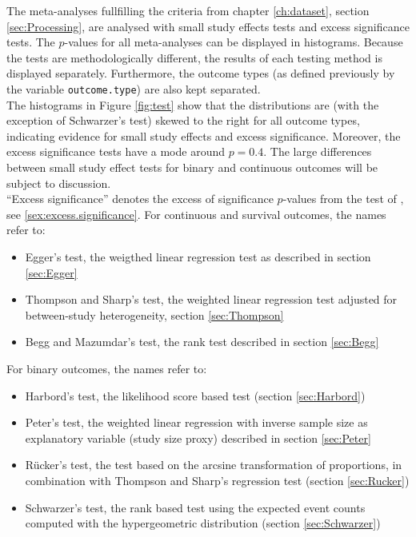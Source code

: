 \documentclass[11pt,a4paper,twoside]{book}\usepackage[]{graphicx}\usepackage[]{color}
\begin{document}
The meta-analyses fullfilling the criteria from chapter \ref{ch:dataset}, section \ref{sec:Processing}, are analysed with small study effects tests and excess significance tests. The $p$-values for all meta-analyses can be displayed in histograms. Because the tests are methodologically different, the results of each testing method is displayed separately. Furthermore, the outcome types (as defined previously by the variable \texttt{outcome.type}) are also kept separated.\\
The histograms in Figure \ref{fig:test} show that the distributions are (with the exception of Schwarzer's test) skewed to the right for all outcome types, indicating evidence for small study effects and excess significance. Moreover, the excess significance tests have a mode around $p = 0.4$. The large differences between small study effect tests for binary and continuous outcomes will be subject to discussion.\\
``Excess significance'' denotes the excess of significance $p$-values from the test of \citet{excess.significance}, see \ref{sex:excess.significance}. For continuous and survival outcomes, the names refer to: 

\begin{itemize}
\item Egger's test, the weigthed linear regression test as described in section \ref{sec:Egger}
\item Thompson and Sharp's test, the weighted linear regression test adjusted for between-study heterogeneity, section \ref{sec:Thompson}
\item Begg and Mazumdar's test, the rank test described in section \ref{sec:Begg}
\end{itemize}

For binary outcomes, the names refer to:
\begin{itemize}
\item Harbord's test, the likelihood score based test (section \ref{sec:Harbord})
\item Peter's test, the weighted linear regression with inverse sample size as explanatory variable (study size proxy) described in section \ref{sec:Peter}
\item R\"ucker's test, the test based on the arcsine transformation of proportions, in combination with Thompson and Sharp's regression test (section \ref{sec:Rucker})
\item Schwarzer's test, the rank based test using the expected event counts computed with the hypergeometric distribution (section \ref{sec:Schwarzer})
\end{itemize}
\end{document}
